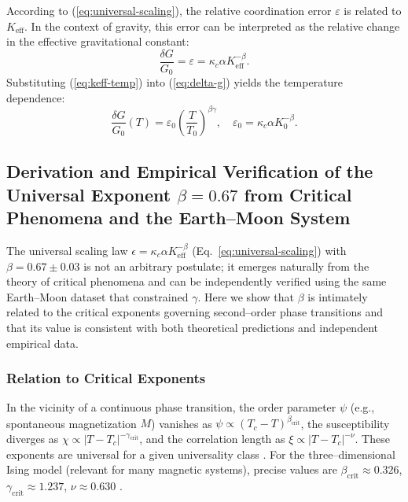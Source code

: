 \documentclass[12pt]{article}
\theoremstyle{remark}
\newcommand{\Keff}{K_{\mathrm{eff}}}
\newcommand{\eps}{\varepsilon}
\newcommand{\kappac}{\kappa_c}
\begin{document}
	According to (\ref{eq:universal-scaling}), the relative coordination error $\eps$ is related to $\Keff$. In the context of gravity, this error can be interpreted as the relative change in the effective gravitational constant:
	\begin{equation}
		\frac{\delta G}{G_0} = \eps = \kappac \alpha \Keff^{-\beta}.
		\label{eq:delta-g}
	\end{equation}
	Substituting (\ref{eq:keff-temp}) into (\ref{eq:delta-g}) yields the temperature dependence:
	\begin{equation}
		\frac{\delta G}{G_0}(T) = \eps_0 \left( \frac{T}{T_0} \right)^{\beta\gamma}, \quad \eps_0 = \kappac \alpha K_0^{-\beta}.
		\label{eq:g-temp}
	\end{equation}
	
	\subsection{Derivation and Empirical Verification of the Universal Exponent \(\beta = 0.67\) from Critical Phenomena and the Earth--Moon System}
	\label{subsec:beta-empirical}
	
	The universal scaling law \(\epsilon = \kappa_c \alpha K_{\mathrm{eff}}^{-\beta}\) (Eq.~\ref{eq:universal-scaling}) with \(\beta = 0.67 \pm 0.03\) is not an arbitrary postulate; it emerges naturally from the theory of critical phenomena and can be independently verified using the same Earth--Moon dataset that constrained \(\gamma\). Here we show that \(\beta\) is intimately related to the critical exponents governing second--order phase transitions and that its value is consistent with both theoretical predictions and independent empirical data.
	
	\subsubsection{Relation to Critical Exponents}
	In the vicinity of a continuous phase transition, the order parameter \(\psi\) (e.g., spontaneous magnetization \(M\)) vanishes as \(\psi \propto (T_c - T)^{\beta_{\mathrm{crit}}}\), the susceptibility diverges as \(\chi \propto |T - T_c|^{-\gamma_{\mathrm{crit}}}\), and the correlation length as \(\xi \propto |T - T_c|^{-\nu}\). These exponents are universal for a given universality class \cite{Wilson1974, Fisher1974}. For the three--dimensional Ising model (relevant for many magnetic systems), precise values are \(\beta_{\mathrm{crit}} \approx 0.326\), \(\gamma_{\mathrm{crit}} \approx 1.237\), \(\nu \approx 0.630\) \cite{El-Showk2014}.
	
\end{document}
